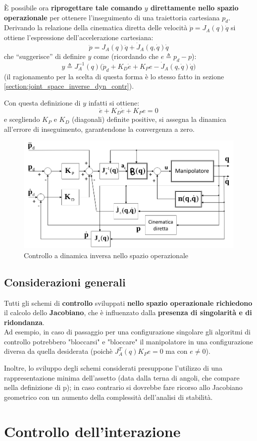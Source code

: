 È possibile ora \textbf{riprogettare tale comando $y$ direttamente nello spazio operazionale} per ottenere l’inseguimento di una traiettoria cartesiana $p_d$.
Derivando la relazione della cinematica diretta delle velocità $\dot{p} = J_A(q)\dot{q}$ si ottiene l’espressione dell’accelerazione cartesiana:
$$
\ddot{p} = J_A(q)\ddot{q} + \dot{J}_A(q, \dot{q})\dot{q}
$$
che “suggerisce” di definire $y$ come (ricordando che $e \triangleq p_d - p$):
$$
y \triangleq J_{A}^{-1}(q)\bigl(\ddot{p}_{d}+K_{D}\dot{e}+K_{P}e-\dot{J}_{A}(q,\dot{q})\dot{q}\bigr)
$$
(il ragionamento per la scelta di questa forma è lo stesso fatto in sezione \ref{section:joint_space_inverse_dyn_contr}).

Con questa definizione di $y$ infatti si ottiene:
$$
\ddot{e} + K_D\dot{e} + K_Pe = 0
$$
e scegliendo $K_P$ e $K_D$ (diagonali) definite positive, si assegna la dinamica all’errore di inseguimento, garantendone la convergenza a zero.

\begin{figure}[H]
	\centering
	\includegraphics[width=0.7\linewidth]{images/inverse_dyn_control_oper_space}
	\caption{Controllo a dinamica inversa nello spazio operazionale}
	\label{fig:inversedyncontroloperspace}
\end{figure}
\unboldmath




\subsection{Considerazioni generali}
Tutti gli schemi di \textbf{controllo} sviluppati \textbf{nello spazio operazionale richiedono} il calcolo dello \textbf{Jacobiano}, che è influenzato dalla \textbf{presenza di singolarità e di ridondanza}.\\
Ad esempio, in caso di passaggio per una configurazione singolare gli algoritmi di controllo potrebbero "bloccarsi" e "bloccare" il manipolatore in una configurazione diversa da quella desiderata (poichè $J_A^T(q)K_Pe=0$ ma con $e \neq 0$).

Inoltre, lo sviluppo degli schemi considerati presuppone l’utilizzo di una rappresentazione minima dell’assetto (data dalla terna di angoli, che compare nella definizione di p); in caso contrario si dovrebbe fare ricorso allo Jacobiano geometrico con un aumento della complessità dell’analisi di stabilità.












\section{Controllo dell’interazione}
